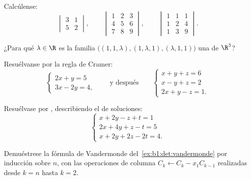 \begin{exercise}[$\star$]\label{exo:b1:det:1}
Calcúlense:
\[
\begin{vmatrix} 3 & 1\\ 5 & 2 \end{vmatrix},
\qquad
\begin{vmatrix} 1 & 2 & 3\\ 4 & 5 & 6\\ 7 & 8 & 9\end{vmatrix},
\qquad
\begin{vmatrix} 1 & 1 & 1\\ 1 & 2 & 4\\ 1 & 3 & 9\end{vmatrix}.
\]
\end{exercise}

\begin{exercise}[$\star$]\label{exo:b1:det:2}
¿Para qué $\lambda \in \R$ es la familia
$\bigl((1, 1, \lambda), (1, \lambda, 1), (\lambda, 1, 1)\bigr)$ una
 de $\R^3$?
\end{exercise}

\begin{exercise}[$\star$]\label{exo:b1:det:3}
Resuélvanse por la regla de Cramer:
\[
\begin{cases}
2x + y = 5\\
3x - 2y = 4 ,
\end{cases}
\qquad\text{y después}\qquad
\begin{cases}
x + y + z = 6\\
x - y + z = 2\\
2x + y - z = 1 .
\end{cases}
\]
\end{exercise}

\begin{exercise}[$\star$]\label{exo:b1:det:4}
Resuélvase por , describiendo el  de soluciones:
\[
\begin{cases}
x + 2y - z + t = 1\\
2x + 4y + z - t = 5\\
x + 2y + 2z - 2t = 4 .
\end{cases}
\]
\end{exercise}

\begin{exercise}[$\star\star$]\label{exo:b1:det:5}
Demuéstrese la fórmula de Vandermonde
del~\cref{ex:b1:det:vandermonde} por inducción sobre $n$, con las
operaciones de columna $C_k \leftarrow C_k - x_1 C_{k-1}$ realizadas
desde $k = n$ hasta $k = 2$.
\end{exercise}

